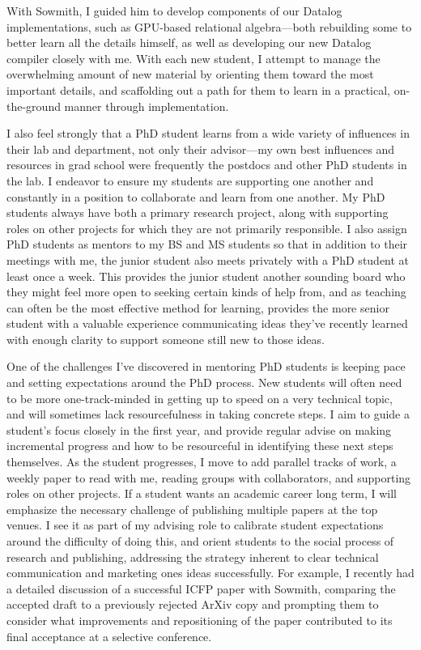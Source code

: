\documentclass[12pt]{article}
\begin{document}
With Sowmith, I guided him to develop components of our Datalog implementations, such as GPU-based relational algebra---both rebuilding some to better learn all the details himself, as well as developing our new Datalog compiler closely with me. With each new student, I attempt to manage the overwhelming amount of new material by orienting them toward the most important details, and scaffolding out a path for them to learn in a practical, on-the-ground manner through implementation.

I also feel strongly that a PhD student learns from a wide variety of influences in their lab and department, not only their advisor---my own best influences and resources in grad school were frequently the postdocs and other PhD students in the lab. I endeavor to ensure my students are supporting one another and constantly in a position to collaborate and learn from one another. My PhD students always have both a primary research project, along with supporting roles on other projects for which they are not primarily responsible. I also assign PhD students as mentors to my BS and MS students so that in addition to their meetings with me, the junior student also meets privately with a PhD student at least once a week. This provides the junior student another sounding board who they might feel more open to seeking certain kinds of help from, and as teaching can often be the most effective method for learning, provides the more senior student with a valuable experience communicating ideas they've recently learned with enough clarity to support someone still new to those ideas.

One of the challenges I've discovered in mentoring PhD students is keeping pace and setting expectations around the PhD process. New students will often need to be more one-track-minded in getting up to speed on a very technical topic, and will sometimes lack resourcefulness in taking concrete steps. I aim to guide a student's focus closely in the first year, and provide regular advise on making incremental progress and how to be resourceful in identifying these next steps themselves. As the student progresses, I move to add parallel tracks of work, a weekly paper to read with me, reading groups with collaborators, and supporting roles on other projects. If a student wants an academic career long term, I will emphasize the necessary challenge of publishing multiple papers at the top venues. I see it as part of my advising role to calibrate student expectations around the difficulty of doing this, and orient students to the social process of research and publishing, addressing the strategy inherent to clear technical communication and marketing ones ideas successfully. For example, I recently had a detailed discussion of a successful ICFP paper with Sowmith, comparing the accepted draft to a previously rejected ArXiv copy and prompting them to consider what improvements and repositioning of the paper contributed to its final acceptance at a selective conference.
\end{document}
